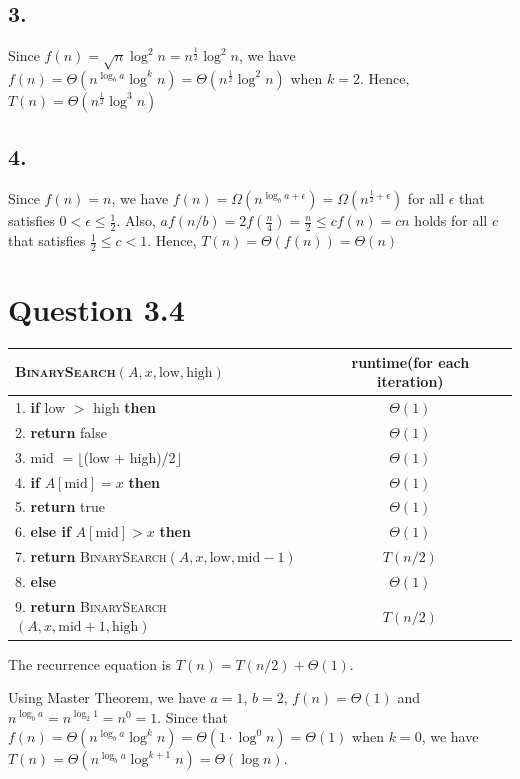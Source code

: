 \documentclass[a4paper,12pt]{article}
\begin{document}
\subsection*{3.}
Since $f(n) = \sqrt{n} \log^2 n = n^{\frac{1}{2}}\log^2 n$, we have $f(n) = \Theta(n^{\log_b a}\log^k n) = \Theta(n^{\frac{1}{2}}\log^2 n)$ when $k = 2$.
Hence, $T(n) = \Theta(n^{\frac{1}{2}}\log^3 n)$

\subsection*{4.}
Since $f(n) = n$, we have $f(n) = \Omega(n^{\log_b a + \epsilon}) = \Omega(n^{\frac{1}{2} + \epsilon})$ for all $\epsilon$ that satisfies $0 < \epsilon \leq \frac{1}{2}$.
Also, $af(n/b) = 2f(\frac{n}{4}) = \frac{n}{2} \leq cf(n) = cn$ holds for all $c$ that satisfies $\frac{1}{2} \leq c < 1$.
Hence, $T(n) = \Theta(f(n)) = \Theta(n)$

\section*{Question 3.4}
\begin{center}
	\begin{tabular}{lc}
		\toprule
		\textsc{BinarySearch}$(A, x, \text{low}, \text{high})$ & runtime(for each iteration)\\
		\midrule
		1. \textbf{if} low $>$ high \textbf{then} & $\Theta(1)$\\
		2. \qquad \textbf{return} false & $\Theta(1)$\\
		3. mid $= \lfloor$(low + high)/2$\rfloor$ & $\Theta(1)$\\
		4. \textbf{if} $A[\text{mid}] = x$ \textbf{then} & $\Theta(1)$\\
		5. \qquad \textbf{return} true & $\Theta(1)$\\
		6. \textbf{else if} $A[\text{mid}] > x$ \textbf{then} & $\Theta(1)$\\
		7. \qquad \textbf{return} \textsc{BinarySearch}$(A, x, \text{low}, \text{mid}-1)$ & $T(n/2)$\\
		8. \textbf{else} & $\Theta(1)$\\
		9. \qquad \textbf{return} \textsc{BinarySearch}$(A, x, \text{mid}+1, \text{high})$ & $T(n/2)$\\
		\bottomrule
	\end{tabular}
\end{center}
The recurrence equation is $T(n) = T(n/2) + \Theta(1)$.

Using Master Theorem, we have $a = 1$, $b = 2$, $f(n) = \Theta(1)$ and $n^{\log_b a} = n^{\log_2 1} = n^0 = 1$.
Since that $f(n) = \Theta(n^{\log_b a}\log^k n) = \Theta(1\cdot \log^0 n) = \Theta(1)$ when $k = 0$, we have $T(n) = \Theta(n^{\log_b a}\log^{k+1} n) = \Theta(\log n)$.
\end{document}
